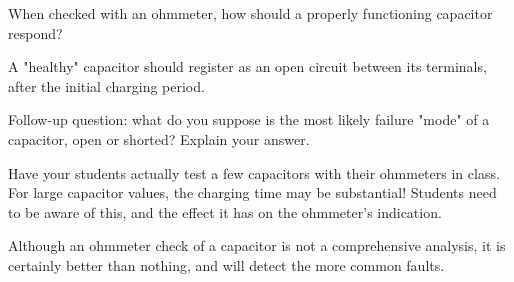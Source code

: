 

When checked with an ohmmeter, how should a properly functioning capacitor respond?







A "healthy" capacitor should register as an open circuit between its terminals, after the initial charging period.

\vskip 10pt

Follow-up question: what do you suppose is the most likely failure "mode" of a capacitor, open or shorted?  Explain your answer.







Have your students actually test a few capacitors with their ohmmeters in class.  For large capacitor values, the charging time may be substantial!  Students need to be aware of this, and the effect it has on the ohmmeter's indication.

Although an ohmmeter check of a capacitor is not a comprehensive analysis, it is certainly better than nothing, and will detect the more common faults.




